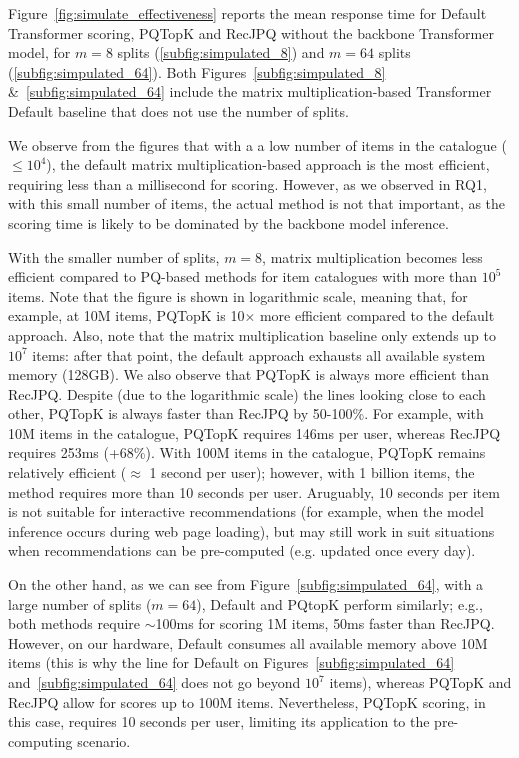 \documentclass[sigconf,natbib=true, review=False]{acmart} %
\newcommand{\pageenlarge}[1]{\marginnote{#1}\enlargethispage{#1\baselineskip}}
\newcommand{\rsasha}[1]{\textcolor[HTML]{000000}{#1}}
\newcommand{\gsasha}[1]{\textcolor[HTML]{000000}{#1}}
\newcommand{\scr}[1]{\textcolor[HTML]{000000}{#1}}
\newcommand{\scrc}[1]{\textcolor[HTML]{000000}{#1}}
\begin{document}
Figure~\ref{fig:simulate_effectiveness} reports the mean response time for Default Transformer scoring, PQTopK and RecJPQ without the backbone Transformer model, for  $m=8$ splits (\ref{subfig:simpulated_8}) and $m=64$ splits (\ref{subfig:simpulated_64}).
Both \scr{Figures}~\ref{subfig:simpulated_8} \&~\ref{subfig:simpulated_64} include the matrix multiplication-based Transformer Default baseline that does not \gsasha{use} the number of splits. 

We observe from the figures that with \scr{a} a low number of items in the catalogue ($\leq 10^4$), the default matrix multiplication-based approach is the most efficient, requiring less than a millisecond for scoring. However, as we observed in RQ1, with this small number of items, the actual method is not that important, as the scoring time is likely to be dominated by the backbone model inference. 

With the smaller number of splits, $m=8$, matrix multiplication becomes \gsasha{less efficient compared to PQ-based methods for item catalogues with more than $10^5$} items. Note that the figure is shown in logarithmic scale, meaning that, for example, at 10M items, PQTopK is \gsasha{10$\times$} more efficient compared to the default approach. Also, note that the matrix multiplication baseline only extends up to $10^7$ items: after that point, the default approach exhausts all available system memory (128GB). We also observe that PQTopK is always more efficient than RecJPQ. Despite (due to the logarithmic scale) the lines looking close to each other, PQTopK is always faster than RecJPQ by 50-100\%. For example, with 10M items in the catalogue, PQTopK requires 146ms per user, whereas \scr{RecJPQ} requires 253ms (+68\%). With 100M items in the catalogue, PQTopK remains relatively efficient ($\approx$ 1 second per user); however, with 1 billion items, the method requires more than 10 seconds \scr{per user}. \rsasha{Aruguably, 10 seconds per item is not suitable for interactive recommendations (for example, when the model inference occurs during web page loading), but may still \gsasha{work} in \gsasha{suit} situations when recommendations can be pre-computed \gsasha{(e.g. updated once every day)}. }

 On the other hand, as we can see from Figure~\ref{subfig:simpulated_64}, \gsasha{with} a large number of splits ($m=64$), \gsasha{Default} and PQtopK perform \gsasha{similarly}; \gsasha{e.g.}, both methods require  $\sim$100ms for scoring 1M items, \rsasha{50ms faster than RecJPQ}. However, \scrc{on our hardware,}  \gsasha{Default} consumes all available memory above 10M items \scrc{(this is why the line for Default on Figures~\ref{subfig:simpulated_64} and~\ref{subfig:simpulated_64} does not go beyond $10^7$ items)}, whereas PQTopK and RecJPQ allow for scores up to \scrc{100M items}. \scrc{Nevertheless}, PQTopK scoring, in this case, requires 10 seconds per user, limiting its application to the pre-computing scenario. 
\end{document}

